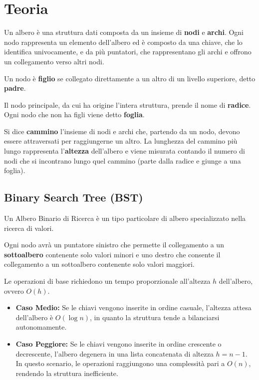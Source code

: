 \documentclass{article}
\begin{document}
\section{Teoria}
Un albero è una struttura dati composta da un insieme di \textbf{nodi} e \textbf{archi}. Ogni nodo rappresenta un elemento dell'albero ed è composto da una chiave, che lo identifica univocamente, e da più puntatori, che rappresentano gli archi e offrono un collegamento verso altri nodi.

Un nodo è \textbf{figlio} se collegato direttamente a un altro di un livello superiore, detto \textbf{padre}.

\bigskip
Il nodo principale, da cui ha origine l'intera struttura, prende il nome di \textbf{radice}. Ogni nodo che non ha figli viene detto \textbf{foglia}.

Si dice \textbf{cammino} l'insieme di nodi e archi che, partendo da un nodo, devono essere attraversati per raggiungerne un altro. La lunghezza del cammino più lungo rappresenta l'\textbf{altezza} dell'albero e viene misurata contando il numero di nodi che si incontrano lungo quel cammino (parte dalla radice e giunge a una foglia).

\subsection{Binary Search Tree (BST)}
Un Albero Binario di Ricerca è un tipo particolare di albero specializzato nella ricerca di valori.

Ogni nodo avrà un puntatore sinistro che permette il collegamento a un \textbf{sottoalbero} contenente solo valori minori e uno destro che consente il collegamento a un sottoalbero contenente solo valori maggiori.

\bigskip
Le operazioni di base richiedono un tempo proporzionale all'altezza $h$ dell'albero, ovvero $O(h)$.
\begin{itemize}
    \item \textbf{Caso Medio:} Se le chiavi vengono inserite in ordine casuale, l'altezza attesa dell'albero è $O(\log n)$, in quanto la struttura tende a bilanciarsi autonomamente.
    \item \textbf{Caso Peggiore:} Se le chiavi vengono inserite in ordine crescente o decrescente, l'albero degenera in una lista concatenata di altezza $h = n - 1$. In questo scenario, le operazioni raggiungono una complessità pari a $O(n)$, rendendo la struttura inefficiente.
\end{itemize}
\end{document}
